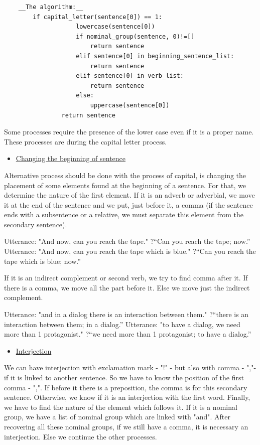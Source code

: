 \documentclass[twoside,a4paper,10pt]{report}
\newcommand{\dokuunderline}[1]{\underline{#1}}
\newcommand{\dokuitem}{\item}
\begin{document}
\lstset{language=python}
\begin{lstlisting}
	__The algorithm:__
		if capital_letter(sentence[0]) == 1:
                    lowercase(sentence[0])
                    if nominal_group(sentence, 0)!=[]
                        return sentence
                    elif sentence[0] in beginning_sentence_list:
                        return sentence
                    elif sentence[0] in verb_list:
                        return sentence
                    else:
                        uppercase(sentence[0])
                return sentence

\end{lstlisting}

Some processes require the presence of the lower case even if it is a proper name. These processes are during the capital letter process.



\begin{itemize}
\dokuitem  \dokuunderline{Changing the beginning of sentence}
\end{itemize}
Alternative process should be done with the process of capital, is changing the placement of some elements found at the beginning of a sentence. For that, we determine the nature of the first element. If it is an adverb or adverbial, we move it at the end of the sentence and we put, just before it, a comma (if the sentence ends with a subsentence or a relative, we must separate this element from the secondary sentence).


\small
\begin{verbatimtab}
  Utterance: "And now, can you reach the tape."
  ?“Can you reach the tape; now.”
  Utterance: "And now, can you reach the tape which is blue."
  ?“Can you reach the tape which is blue; now.”
\end{verbatimtab}
\normalsize
If it is an indirect complement or second verb, we try to find comma after it. If there is a comma, we move all the part before it. Else we move just the indirect complement. 


\small
\begin{verbatimtab}
  Utterance: "and in a dialog there is an interaction between them."
  ?“there is an interaction between them; in a dialog.”
  Utterance: "to have a dialog, we need more than 1 protagonist."
  ?“we need more than 1 protagonist; to have a dialog.”
\end{verbatimtab}
\normalsize

\begin{itemize}
\dokuitem  \dokuunderline{Interjection}
\end{itemize}
We can have interjection with exclamation mark - "!" - but also with comma - ","- if it is linked to another sentence. So we have to know the position of the first comma - ",". If before it there is a preposition, the comma is for this secondary sentence. Otherwise, we know if it is an interjection with the first word. Finally, we have to find the nature of the element which follows it. If it is a nominal group, we have a list of nominal group which are linked with "and". After recovering all these nominal groups, if we still have a comma, it is necessary an interjection. Else we continue the other processes.
\end{document}
